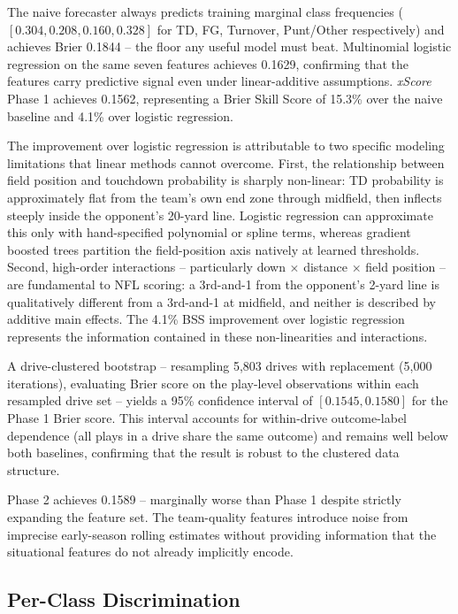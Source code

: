 \documentclass[12pt,a4paper]{article}
\newcommand{\xscore}{\textit{xScore}}
\begin{document}
The naive forecaster always predicts training marginal class frequencies ($[0.304, 0.208, 0.160, 0.328]$ for TD, FG, Turnover, Punt/Other respectively) and achieves Brier 0.1844 -- the floor any useful model must beat. Multinomial logistic regression on the same seven features achieves 0.1629, confirming that the features carry predictive signal even under linear-additive assumptions. \xscore{} Phase 1 achieves 0.1562, representing a Brier Skill Score of 15.3\% over the naive baseline and 4.1\% over logistic regression.

The improvement over logistic regression is attributable to two specific modeling limitations that linear methods cannot overcome. First, the relationship between field position and touchdown probability is sharply non-linear: TD probability is approximately flat from the team's own end zone through midfield, then inflects steeply inside the opponent's 20-yard line. Logistic regression can approximate this only with hand-specified polynomial or spline terms, whereas gradient boosted trees partition the field-position axis natively at learned thresholds. Second, high-order interactions -- particularly down $\times$ distance $\times$ field position -- are fundamental to NFL scoring: a 3rd-and-1 from the opponent's 2-yard line is qualitatively different from a 3rd-and-1 at midfield, and neither is described by additive main effects. The 4.1\% BSS improvement over logistic regression represents the information contained in these non-linearities and interactions.

A drive-clustered bootstrap -- resampling 5,803 drives with replacement (5,000 iterations), evaluating Brier score on the play-level observations within each resampled drive set -- yields a 95\% confidence interval of $[0.1545, 0.1580]$ for the Phase 1 Brier score. This interval accounts for within-drive outcome-label dependence (all plays in a drive share the same outcome) and remains well below both baselines, confirming that the result is robust to the clustered data structure.

Phase 2 achieves 0.1589 -- marginally worse than Phase 1 despite strictly expanding the feature set. The team-quality features introduce noise from imprecise early-season rolling estimates without providing information that the situational features do not already implicitly encode.

\subsection{Per-Class Discrimination}
\end{document}
